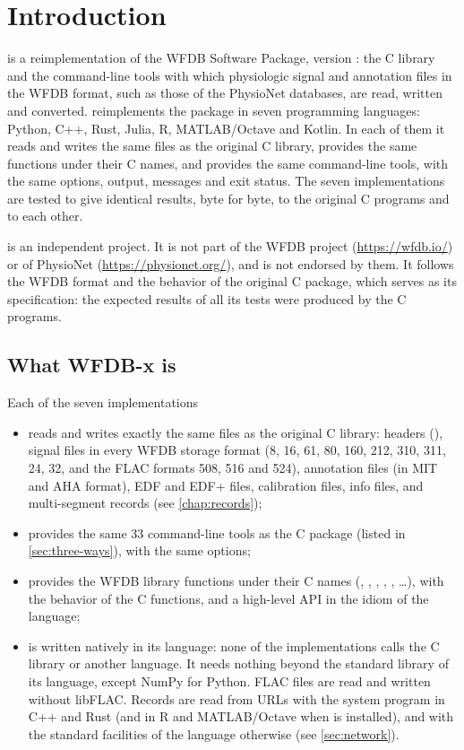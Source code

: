 \chapter{Introduction}
\label{chap:introduction}

\wfdbx{} is a reimplementation of the WFDB Software Package, version
\wfdbversion{}: the C library and the command-line tools with which
physiologic signal and annotation files in the WFDB format, such as those of
the PhysioNet databases, are read, written and converted. \wfdbx{}
reimplements the package in seven programming languages: Python, C++, Rust,
Julia, R, MATLAB/Octave and Kotlin. In each of them it reads and writes the
same files as the original C library, provides the same functions under
their C names, and provides the same command-line tools, with the same
options, output, messages and exit status. The seven implementations are
tested to give identical results, byte for byte, to the original C programs
and to each other.

\wfdbx{} is an independent project. It is not part of the WFDB project
(\url{https://wfdb.io/}) or of PhysioNet (\url{https://physionet.org/}), and
is not endorsed by them. It follows the WFDB format and the behavior of the
original C package, which serves as its specification: the expected results
of all its tests were produced by the C programs.

\section{What WFDB-x is}
\label{sec:what}

Each of the seven implementations
\begin{itemize}
\item reads and writes exactly the same files as the original C library:
  headers (), signal files in every WFDB storage format (8, 16,
  61, 80, 160, 212, 310, 311, 24, 32, and the FLAC formats 508, 516 and
  524), annotation files (in MIT and AHA format), EDF and EDF+ files,
  calibration files, info files, and multi-segment records (see
  \cref{chap:records});
\item provides the same 33 command-line tools as the C package (listed in
  \cref{sec:three-ways}), with the same options;
\item provides the WFDB library functions under their C names
  (, , , ,
  , \ldots), with the behavior of the C functions, and a
  high-level API in the idiom of the language;
\item is written natively in its language: none of the implementations calls
  the C library or another language. It needs nothing beyond the standard
  library of its language, except NumPy for Python. FLAC files are read and
  written without libFLAC. Records are read from URLs with the system
   program in C++ and Rust (and in R and MATLAB/Octave when
   is installed), and with the standard facilities of the
  language otherwise (see \cref{sec:network}).
\end{itemize}

